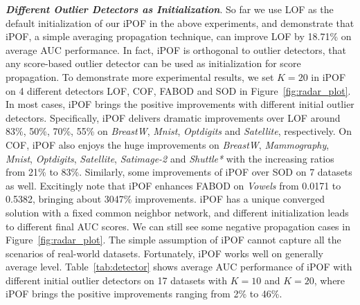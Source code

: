 \documentclass[sigconf,nonacm]{acmart}
\begin{document}
    
     

     
\noindent\textit{\textbf{Different Outlier Detectors as Initialization}}. So far we use LOF as the default initialization of our iPOF in the above experiments, and demonstrate that iPOF, a simple averaging propagation technique, can improve LOF by 18.71\% on average AUC performance. In fact, iPOF is orthogonal to outlier detectors, that any score-based outlier detector can be used as initialization for score propagation. To demonstrate more experimental results, we set $K=20$ in iPOF on 4 different detectors LOF, COF, FABOD and SOD in Figure\textcolor{red}{~\ref{fig:radar_plot}}. In most cases, iPOF brings the positive improvements with different initial outlier detectors. Specifically, iPOF delivers dramatic improvements over LOF around 83\%, 50\%, 70\%, 55\% on \textit{BreastW}, \textit{Mnist}, \textit{Optdigits} and \textit{Satellite}, respectively. On COF, iPOF also enjoys the huge improvements on \textit{BreastW}, \textit{Mammography}, \textit{Mnist}, \textit{Optdigits}, \textit{Satellite}, \textit{Satimage-2} and \textit{Shuttle*} with the increasing ratios from 21\% to 83\%. Similarly, some improvements of iPOF over SOD on 7 datasets as well. Excitingly note that iPOF enhances FABOD on \textit{Vowels} from 0.0171 to 0.5382, bringing about 3047\% improvements. iPOF has a unique converged solution with a fixed common neighbor network, and different initialization leads to different final AUC scores. We can still see some negative propagation cases in Figure\textcolor{red}{~\ref{fig:radar_plot}}. The simple assumption of iPOF cannot capture all the scenarios of real-world datasets. Fortunately, iPOF works well on generally average level. Table\textcolor{red}{~\ref{tab:detector}} shows average AUC performance of iPOF with different initial outlier detectors on 17 datasets with $K=10$ and $K=20$, where iPOF brings the positive improvements ranging from 2\% to 46\%.

\begin{table}[t]
\caption {Average AUC performance of iPOF with different outlier detectors as initialization} \vspace{-0.3cm}
\label{tab:detector}
\end{table}  
\end{document}
